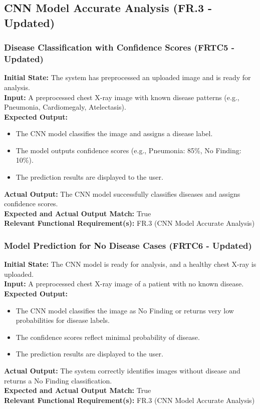 \documentclass[12pt, titlepage]{article}
\begin{document}
\subsection{CNN Model Accurate Analysis (FR.3 - Updated)}
\subsubsection{Disease Classification with Confidence Scores (FRTC5 - Updated)}
\textbf{Initial State:} The system has preprocessed an uploaded image and is ready for analysis.\\
\textbf{Input:} A preprocessed chest X-ray image with known disease patterns (e.g., Pneumonia, Cardiomegaly, Atelectasis).\\
\textbf{Expected Output:}
\begin{itemize}
\item The CNN model classifies the image and assigns a disease label.
\item The model outputs confidence scores (e.g., Pneumonia: 85\%, No Finding: 10\%).
\item The prediction results are displayed to the user.
\end{itemize}
\textbf{Actual Output:} The CNN model successfully classifies diseases and assigns confidence scores.\\
\textbf{Expected and Actual Output Match:} True\\
\textbf{Relevant Functional Requirement(s):} FR.3 (CNN Model Accurate Analysis)\\

\subsubsection{Model Prediction for No Disease Cases (FRTC6 - Updated)}
\textbf{Initial State:} The CNN model is ready for analysis, and a healthy chest X-ray is uploaded.\\
\textbf{Input:} A preprocessed chest X-ray image of a patient with no known disease.\\
\textbf{Expected Output:}
\begin{itemize}
\item The CNN model classifies the image as No Finding or returns very low probabilities for disease labels.
\item The confidence scores reflect minimal probability of disease.
\item The prediction results are displayed to the user.
\end{itemize}
\textbf{Actual Output:} The system correctly identifies images without disease and returns a No Finding classification.\\
\textbf{Expected and Actual Output Match:} True\\
\textbf{Relevant Functional Requirement(s):} FR.3 (CNN Model Accurate Analysis)\\
\end{document}
